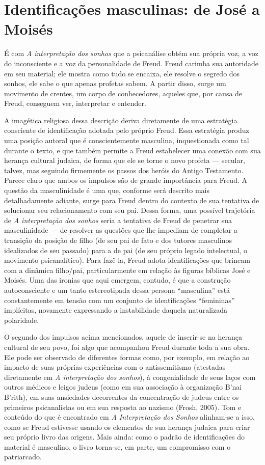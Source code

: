 \section{Identificações masculinas: de José a Moisés}

É com \emph{A interpretação dos sonhos} que a psicanálise obtém sua
própria voz, a voz do inconsciente e a voz da personalidade de Freud.
Freud carimba sua autoridade em seu material; ele mostra como tudo se
encaixa, ele resolve o segredo dos sonhos, ele sabe o que apenas
profetas sabem. A partir disso, surge um movimento de crentes, um corpo
de conhecedores, aqueles que, por causa de Freud, conseguem ver,
interpretar e entender.

A imagética religiosa dessa descrição deriva diretamente de uma
estratégia consciente de identificação adotada pelo próprio Freud. Essa
estratégia produz uma posição autoral que é conscientemente masculina,
inquestionada como tal durante o texto, e que também permite a Freud
estabelecer uma conexão com sua herança cultural judaica, de forma que
ele se torne o novo profeta --- secular, talvez, mas seguindo firmemente
os passos dos heróis do Antigo Testamento. Parece claro que ambos os
impulsos são de grande importância para Freud. A questão da
masculinidade é uma que, conforme será descrito mais detalhadamente
adiante, surge para Freud dentro do contexto de sua tentativa de
solucionar seu relacionamento com seu pai. Dessa forma, uma possível
trajetória de \emph{A interpretação dos sonhos} seria a tentativa de
Freud de penetrar sua masculinidade --- de resolver as questões que lhe
impediam de completar a transição da posição de filho (de seu pai de
fato e dos tutores masculinos idealizados de seu passado) para a de pai
(de seu próprio legado intelectual, o movimento psicanalítico). Para
fazê-la, Freud adota identificações que brincam com a dinâmica
filho/pai, particularmente em relação às figuras bíblicas José e Moisés.
Uma das ironias que aqui emergem, contudo, é que a construção
autoconsciente e um tanto estereotipada dessa persona ``masculina'' está
constantemente em tensão com um conjunto de identificações ``femininas''
implícitas, novamente expressando a instabilidade daquela naturalizada
polaridade.

O segundo dos impulsos acima mencionados, aquele de inserir-se na
herança cultural de seu povo, foi algo que acompanhou Freud durante toda
a sua obra. Ele pode ser observado de diferentes formas como, por
exemplo, em relação ao impacto de suas próprias experiências com o
antissemitismo (atestadas diretamente em \emph{A interpretação dos
sonhos}), à congenialidade de seus laços com outros médicos e leigos
judeus (como em sua associação à organização B'nai B'rith), em suas
ansiedades decorrentes da concentração de judeus entre os primeiros
psicanalistas ou em sua resposta ao nazismo (Frosh, 2005). Tom e
conteúdo do que é encontrado em \emph{A Interpretação dos Sonhos}
alinham-se a isso, como se Freud estivesse usando os elementos de sua
herança judaica para criar seu próprio livro das origens. Mais ainda:
como o padrão de identificações do material é masculino, o livro
torna-se, em parte, um compromisso com o patriarcado.

